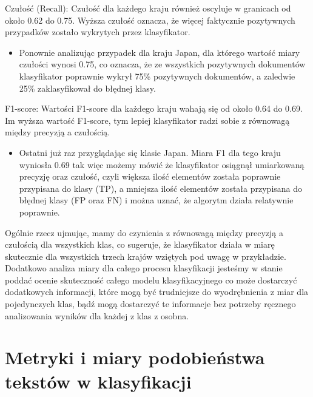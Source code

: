 \documentclass{article}
\begin{document}
\noindent Czułość (Recall): Czułość dla każdego kraju również oscyluje w granicach od około 0.62 do 0.75. Wyższa czułość oznacza, że więcej faktycznie pozytywnych przypadków zostało wykrytych przez klasyfikator.
\begin{itemize}
    \item Ponownie analizując przypadek dla kraju Japan, dla którego wartość miary czułości wynosi 0.75, co oznacza, że ze wszystkich pozytywnych dokumentów klasyfikator poprawnie wykrył 75\% pozytywnych dokumentów, a zaledwie 25\% zaklasyfikował do błędnej klasy. \\
\end{itemize}

\noindent F1-score: Wartości F1-score dla każdego kraju wahają się od około 0.64 do 0.69. Im wyższa wartość F1-score, tym lepiej klasyfikator radzi sobie z równowagą między precyzją a czułością.
\begin{itemize}
    \item Ostatni już raz przyglądając się klasie Japan. Miara F1 dla tego kraju wyniosła 0.69 tak więc możemy mówić że klasyfikator osiągnął umiarkowaną precyzję oraz czułość, czyli większa ilość elementów została poprawnie przypisana do klasy (TP), a mniejsza ilość elementów została przypisana do błędnej klasy (FP oraz FN) i można uznać, że algorytm działa relatywnie poprawnie.
\end{itemize}

\noindent Ogólnie rzecz ujmując, mamy do czynienia z równowagą między precyzją a czułością dla wszystkich klas, co sugeruje, że klasyfikator działa w miarę skutecznie dla wszystkich trzech krajów wziętych pod uwagę w przykładzie.\\

\noindent Dodatkowo analiza miary dla całego procesu klasyfikacji jesteśmy w stanie poddać ocenie skuteczność całego modelu klasyfikacyjnego co może dostarczyć dodatkowych informacji, które mogą być trudniejsze do wyodrębnienia z miar dla pojedynczych klas, bądź mogą dostarczyć te informacje bez potrzeby ręcznego analizowania wyników dla każdej z  klas z osobna.






\section{Metryki i miary podobieństwa tekstów w klasyfikacji}
\end{document}
